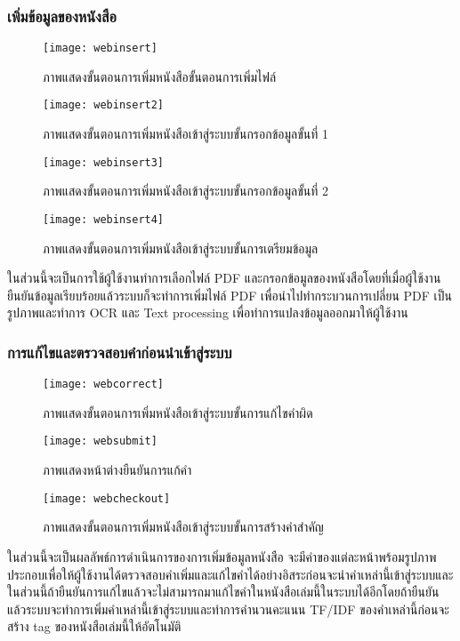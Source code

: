 \subsubsection{เพิ่มข้อมูลของหนังสือ}
\begin{figure}[H]
    \centering
    \texttt{[image: webinsert]}
    \caption{ภาพแสดงขั้นตอนการเพิ่มหนังสือขั้นตอนการเพิ่มไฟล์}\label{fig:webinsert}
\end{figure}
\begin{figure}[H]
    \centering
    \texttt{[image: webinsert2]}
    \caption{ภาพแสดงขั้นตอนการเพิ่มหนังสือเข้าสู่ระบบขั้นกรอกข้อมูลขั้นที่ 1}\label{fig:webinsert2}
\end{figure}
\begin{figure}[H]
    \centering
    \texttt{[image: webinsert3]}
    \caption{ภาพแสดงขั้นตอนการเพิ่มหนังสือเข้าสู่ระบบขั้นกรอกข้อมูลขั้นที่ 2}\label{fig:webinsert3}
\end{figure}

\begin{figure}[H]
    \centering
    \texttt{[image: webinsert4]}
    \caption{ภาพแสดงขั้นตอนการเพิ่มหนังสือเข้าสู่ระบบขั้นการเตรียมข้อมูล}\label{fig:webdel}
\end{figure}
ในส่วนนี้จะเป็นการใช้ผู้ใช้งานทำการเลือกไฟล์ PDF และกรอกข้อมูลของหนังสือโดยที่เมื่อผู้ใช้งานยืนยันข้อมูลเรียบร้อยแล้วระบบก็จะทำการเพิ่มไฟล์ PDF เพื่อนำไปทำกระบวนการเปลี่ยน PDF เป็นรูปภาพและทำการ OCR และ Text processing  เพื่อทำการแปลงข้อมูลออกมาให้ผู้ใช้งาน

\subsubsection{การแก้ไขและตรวจสอบคำก่อนนำเข้าสู่ระบบ}
\begin{figure}[H]
    \centering
    \texttt{[image: webcorrect]}
    \caption{ภาพแสดงขั้นตอนการเพิ่มหนังสือเข้าสู่ระบบขั้นการแก้ไขคำผิด}\label{fig:webcorrect}
\end{figure}

\begin{figure}[H]
    \centering
    \texttt{[image: websubmit]}
    \caption{ภาพแสดงหน้าต่างยืนยันการแก้คำ}\label{fig:websubmit}
\end{figure}

\begin{figure}[H]
    \centering
    \texttt{[image: webcheckout]}
    \caption{ภาพแสดงขั้นตอนการเพิ่มหนังสือเข้าสู่ระบบขั้นการสร้างคำสำคัญ}\label{fig:webcheckout}
\end{figure}
ในส่วนนี้จะเป็นผลลัพธ์การดำเนินการของการเพิ่มข้อมูลหนังสือ จะมีคำของแต่ละหน้าพร้อมรูปภาพประกอบเพื่อให้ผู้ใช้งานได้ตรวจสอบคำเพิ่มและแก้ไขคำได้อย่างอิสระก่อนจะนำคำเหล่านี้เข้าสู่ระบบและในส่วนนี้ถ้ายืนยันการแก้ไขแล้วจะไม่สามารถมาแก้ไขคำในหนังสือเล่มนี้ในระบบได้อีกโดยถ้ายืนยันแล้วระบบจะทำการเพิ่มคำเหล่านี้เข้าสู่ระบบและทำการคำนวนคะแนน TF/IDF ของคำเหล่านี้ก่อนจะสร้าง tag ของหนังสือเล่มนี้ให้อัตโนมัติ

